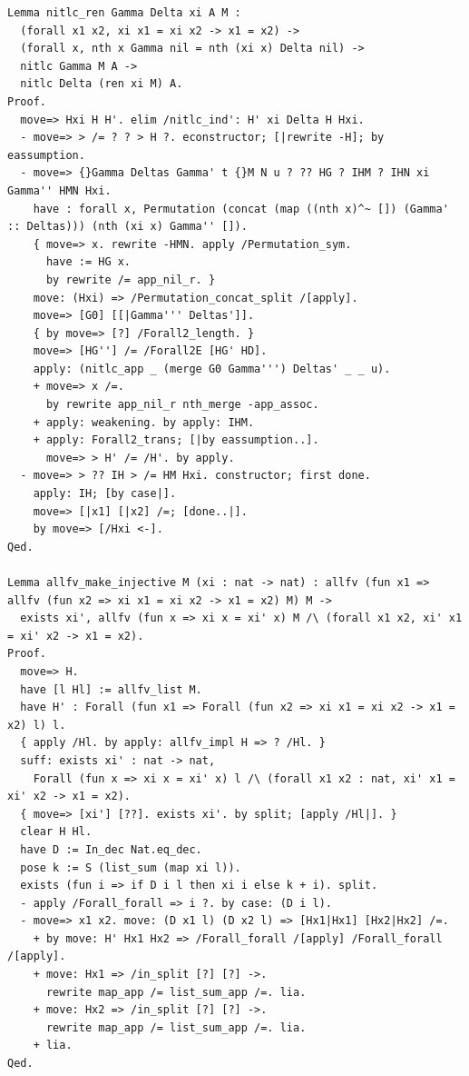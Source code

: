 \begin{lstlisting}[style=authorcoq]
Lemma nitlc_ren Gamma Delta xi A M :
  (forall x1 x2, xi x1 = xi x2 -> x1 = x2) ->
  (forall x, nth x Gamma nil = nth (xi x) Delta nil) ->
  nitlc Gamma M A ->
  nitlc Delta (ren xi M) A.
Proof.
  move=> Hxi H H'. elim /nitlc_ind': H' xi Delta H Hxi.
  - move=> > /= ? ? > H ?. econstructor; [|rewrite -H]; by eassumption.
  - move=> {}Gamma Deltas Gamma' t {}M N u ? ?? HG ? IHM ? IHN xi Gamma'' HMN Hxi.
    have : forall x, Permutation (concat (map ((nth x)^~ []) (Gamma' :: Deltas))) (nth (xi x) Gamma'' []).
    { move=> x. rewrite -HMN. apply /Permutation_sym.
      have := HG x.
      by rewrite /= app_nil_r. }
    move: (Hxi) => /Permutation_concat_split /[apply].
    move=> [G0] [[|Gamma''' Deltas']].
    { by move=> [?] /Forall2_length. }
    move=> [HG''] /= /Forall2E [HG' HD].
    apply: (nitlc_app _ (merge G0 Gamma''') Deltas' _ _ u).
    + move=> x /=.
      by rewrite app_nil_r nth_merge -app_assoc.
    + apply: weakening. by apply: IHM.
    + apply: Forall2_trans; [|by eassumption..].
      move=> > H' /= /H'. by apply.
  - move=> > ?? IH > /= HM Hxi. constructor; first done.
    apply: IH; [by case|].
    move=> [|x1] [|x2] /=; [done..|].
    by move=> [/Hxi <-].
Qed.

Lemma allfv_make_injective M (xi : nat -> nat) : allfv (fun x1 => allfv (fun x2 => xi x1 = xi x2 -> x1 = x2) M) M ->
  exists xi', allfv (fun x => xi x = xi' x) M /\ (forall x1 x2, xi' x1 = xi' x2 -> x1 = x2).
Proof.
  move=> H.
  have [l Hl] := allfv_list M.
  have H' : Forall (fun x1 => Forall (fun x2 => xi x1 = xi x2 -> x1 = x2) l) l.
  { apply /Hl. by apply: allfv_impl H => ? /Hl. }
  suff: exists xi' : nat -> nat,
    Forall (fun x => xi x = xi' x) l /\ (forall x1 x2 : nat, xi' x1 = xi' x2 -> x1 = x2).
  { move=> [xi'] [??]. exists xi'. by split; [apply /Hl|]. }
  clear H Hl.
  have D := In_dec Nat.eq_dec.
  pose k := S (list_sum (map xi l)).
  exists (fun i => if D i l then xi i else k + i). split.
  - apply /Forall_forall => i ?. by case: (D i l).
  - move=> x1 x2. move: (D x1 l) (D x2 l) => [Hx1|Hx1] [Hx2|Hx2] /=.
    + by move: H' Hx1 Hx2 => /Forall_forall /[apply] /Forall_forall /[apply].
    + move: Hx1 => /in_split [?] [?] ->.
      rewrite map_app /= list_sum_app /=. lia.
    + move: Hx2 => /in_split [?] [?] ->.
      rewrite map_app /= list_sum_app /=. lia.
    + lia.
Qed.


\end{lstlisting}
